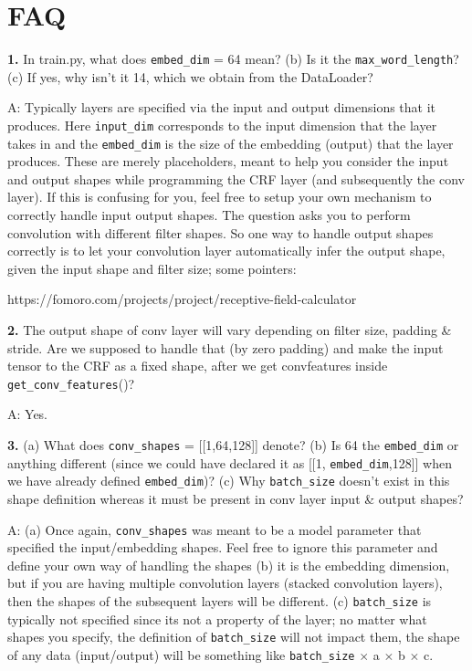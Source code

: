 \documentclass[11pt]{report}
\begin{document}
\section{FAQ}

\textbf{1.} In train.py, what does \verb#embed_dim# = 64 mean? (b) Is it the \verb#max_word_length#? (c) If yes, why isn't it 14, which we obtain from the DataLoader?

A: Typically layers are specified via the input and output dimensions that it produces. Here \verb#input_dim# corresponds to the input dimension that the layer takes in and the \verb#embed_dim# is the size of the embedding (output) that the layer produces. These are merely placeholders, meant to help you consider the input and output shapes while programming the CRF layer (and subsequently the conv layer). If this is confusing for you, feel free to setup your own mechanism to correctly handle input output shapes.
The question asks you to perform convolution with different filter shapes. So one way to handle output shapes correctly is to let your convolution layer automatically infer the output shape, given the input shape and filter size; some pointers:

https://fomoro.com/projects/project/receptive-field-calculator

\textbf{2.} The output shape of conv layer will vary depending on filter size, padding \& stride. Are we supposed to handle that (by zero padding) and make the input tensor to the CRF as a fixed shape, after we get convfeatures inside \verb#get_conv_features#()?

A: Yes. 

\textbf{3.} (a) What does \verb#conv_shapes# = [[1,64,128]] denote? (b) Is 64 the \verb#embed_dim# or anything different (since we could have declared it as [[1, \verb#embed_dim#,128]] when we have already defined \verb#embed_dim#)? (c) Why \verb#batch_size# doesn't exist in this shape definition whereas it must be present in conv layer input \& output shapes?

A: (a) Once again, \verb#conv_shapes# was meant to be a model parameter that specified the input/embedding shapes. Feel free to ignore this parameter and define your own way of handling the shapes (b) it is the embedding dimension, but if you are having multiple convolution layers (stacked convolution layers), then the shapes of the subsequent layers will be different. (c) \verb#batch_size# is typically not specified since its not a property of the layer; no matter what shapes you specify, the definition of \verb#batch_size# will not impact them, the shape of any data (input/output) will be something like \verb#batch_size# $\times$ a $\times$ b $\times$ c.
\end{document}
